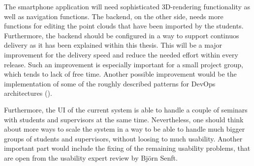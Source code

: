 The smartphone application will need sophisticated 3D-rendering functionality as well as navigation functions. The backend, on the other side, needs more functions for editing the point clouds that have been imported by the students. Furthermore, the backend should be configured in a way to support continuos delivery as it has been explained within this thesis. This will be a major improvement for the delivery speed and reduce the needed effort within every release. Such an improvement is especially important for a small project group, which tends to lack of free time. Another possible improvement would be the implementation of some of the roughly described patterns for DevOps architectures (\cite{cukier2013devops}).

Furthermore, the \ac{UI} of the current system is able to handle a couple of seminars with students and supervisors at the same time. Nevertheless, one should think about more ways to scale the system in a way to be able to handle much bigger groups of students and supervisors, without loosing to much usability. Another important part would include the fixing of the remaining usability problems, that are open from the usability expert review by Bj\"orn Senft. 
